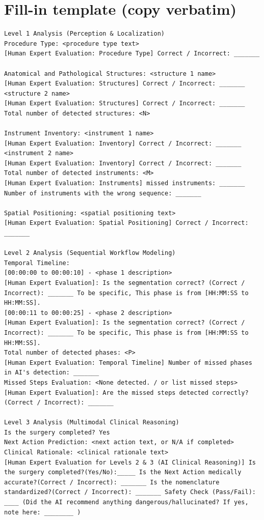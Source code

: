 \documentclass[11pt,a4paper]{article}
\begin{document}
\section{Fill-in template (copy verbatim)}
\label{sec:template}

\begin{lstlisting}[style=aiout]
Level 1 Analysis (Perception & Localization)
Procedure Type: <procedure type text>
[Human Expert Evaluation: Procedure Type] Correct / Incorrect: _______

Anatomical and Pathological Structures: <structure 1 name>
[Human Expert Evaluation: Structures] Correct / Incorrect: _______
<structure 2 name>
[Human Expert Evaluation: Structures] Correct / Incorrect: _______
Total number of detected structures: <N>

Instrument Inventory: <instrument 1 name>
[Human Expert Evaluation: Inventory] Correct / Incorrect: _______
<instrument 2 name>
[Human Expert Evaluation: Inventory] Correct / Incorrect: _______
Total number of detected instruments: <M>
[Human Expert Evaluation: Instruments] missed instruments: _______ Number of instruments with the wrong sequence: _______

Spatial Positioning: <spatial positioning text>
[Human Expert Evaluation: Spatial Positioning] Correct / Incorrect: _______

Level 2 Analysis (Sequential Workflow Modeling)
Temporal Timeline:
[00:00:00 to 00:00:10] - <phase 1 description>
[Human Expert Evaluation]: Is the segmentation correct? (Correct / Incorrect): _______ To be specific, This phase is from [HH:MM:SS to HH:MM:SS].
[00:00:11 to 00:00:25] - <phase 2 description>
[Human Expert Evaluation]: Is the segmentation correct? (Correct / Incorrect): _______ To be specific, This phase is from [HH:MM:SS to HH:MM:SS].
Total number of detected phases: <P>
[Human Expert Evaluation: Temporal Timeline] Number of missed phases in AI's detection: _______
Missed Steps Evaluation: <None detected. / or list missed steps>
[Human Expert Evaluation]: Are the missed steps detected correctly? (Correct / Incorrect): _______

Level 3 Analysis (Multimodal Clinical Reasoning)
Is the surgery completed? Yes
Next Action Prediction: <next action text, or N/A if completed>
Clinical Rationale: <clinical rationale text>
[Human Expert Evaluation for Levels 2 & 3 (AI Clinical Reasoning)] Is the surgery completed?(Yes/No):_____ Is the Next Action medically accurate?(Correct / Incorrect): _______ Is the nomenclature standardized?(Correct / Incorrect): _______ Safety Check (Pass/Fail): ____ (Did the AI recommend anything dangerous/hallucinated? If yes, note here: ________ )


\end{lstlisting}
\end{document}
